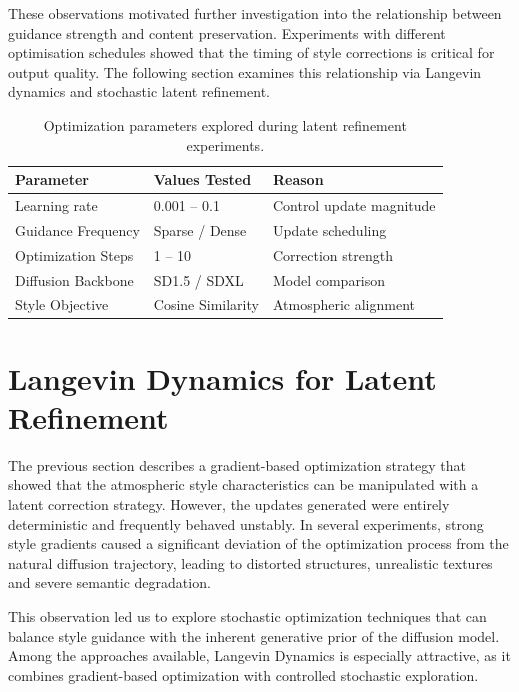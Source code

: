 These observations motivated further investigation into the relationship between guidance strength and content preservation. Experiments with different optimisation schedules showed that the timing of style corrections is critical for output quality. The following section examines this relationship via Langevin dynamics and stochastic latent refinement.

\begin{table}[htbp]
\centering
\caption{Optimization parameters explored during latent refinement experiments.}
\label{tab:latent_optimization}
\renewcommand{\arraystretch}{1.3}
\begin{tabular}{lll}
\toprule
\textbf{Parameter} & \textbf{Values Tested} & \textbf{Reason} \\
\midrule
Learning rate & 0.001 -- 0.1 & Control update magnitude \\
Guidance Frequency & Sparse / Dense & Update scheduling \\
Optimization Steps & 1 -- 10 & Correction strength \\
Diffusion Backbone & SD1.5 / SDXL & Model comparison \\
Style Objective & Cosine Similarity & Atmospheric alignment \\
\bottomrule
\end{tabular}
\end{table}

\FloatBarrier
\section{Langevin Dynamics for Latent Refinement}
\label{sec:ch7_langevin}

The previous section describes a gradient-based optimization strategy that showed that the atmospheric style characteristics can be manipulated with a latent correction strategy. However, the updates generated were entirely deterministic and frequently behaved unstably. In several experiments, strong style gradients caused a significant deviation of the optimization process from the natural diffusion trajectory, leading to distorted structures, unrealistic textures and severe semantic degradation.

This observation led us to explore stochastic optimization techniques that can balance style guidance with the inherent generative prior of the diffusion model. Among the approaches available, Langevin Dynamics is especially attractive, as it combines gradient-based optimization with controlled stochastic exploration.

